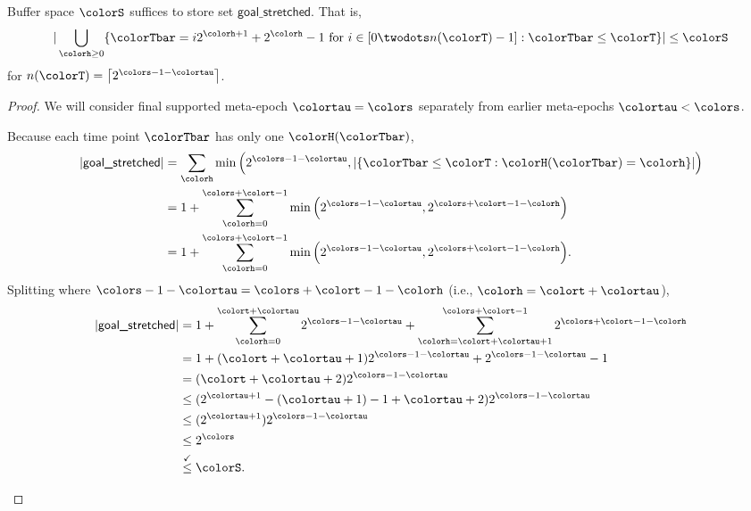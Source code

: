 \begin{lemma}
\label{thm:stretched-first-n-space}

Buffer space $\colorS$ suffices to store set $\textsf{goal\_stretched}$.
That is,
\begin{align*}
|\bigcup_{\colorh \geq 0}
\{ \colorTbar = i2^{\colorh + 1} + 2^{\colorh} - 1 \text{ for } i \in [0 \twodots n(\colorT) - 1] : \colorTbar \leq \colorT \}| \leq \colorS
\end{align*}
for $n(\colorT) = \left\lceil 2^{\colors - 1 - \colortau} \right\rceil$.
\end{lemma}
\begin{proof}
We will consider final supported meta-epoch $\colortau=\colors$ separately from earlier meta-epochs $\colortau<\colors$.

\begin{proofpart}
Because each time point $\colorTbar$ has only one \hv{} $\colorH(\colorTbar)$,
\begin{align*}
|\textsf{goal\_stretched}|
&=
\sum_{\colorh} \min\Big(2^{\colors - 1 - \colortau}, |\{ \colorTbar \leq \colorT : \colorH(\colorTbar) = \colorh \}|\Big)\\
&=
1 + \sum_{\colorh=0}^{\colors + \colort - 1} \min\Big(2^{\colors - 1 - \colortau}, 2^{\colors + \colort - 1 - \colorh}\Big)\\
&=
1 + \sum_{\colorh=0}^{\colors + \colort - 1} \min\Big(2^{\colors - 1 - \colortau}, 2^{\colors + \colort - 1 - \colorh}\Big).
\end{align*}
Splitting where $\colors - 1 - \colortau = \colors + \colort - 1 - \colorh$ (i.e., $\colorh = \colort + \colortau$),
\begin{align*}
|\textsf{goal\_stretched}|
&=
1 + \sum_{\colorh=0}^{\colort + \colortau} 2^{\colors - 1 - \colortau} + \sum_{\colorh=\colort + \colortau + 1}^{\colors + \colort - 1} 2^{\colors + \colort - 1 - \colorh}\\
&=
1 + (\colort + \colortau + 1) 2^{\colors - 1 - \colortau} + 2^{\colors - 1 - \colortau} - 1\\
&=
(\colort + \colortau + 2) 2^{\colors - 1 - \colortau}\\
&\leq
(2^{\colortau + 1} - (\colortau + 1) - 1 + \colortau + 2) 2^{\colors - 1 - \colortau}\\
&\leq
(2^{\colortau + 1}) 2^{\colors - 1 - \colortau}\\
&\leq
2^{\colors}\\
&\stackrel{\checkmark}\leq
\colorS.
\end{align*}
\end{proofpart}


\end{proof}
